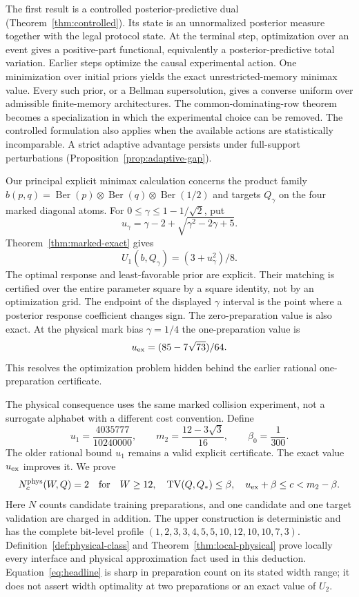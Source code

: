 \documentclass[11pt]{amsart}
\theoremstyle{definition}\newtheorem{definition}[theorem]{Definition}
\theoremstyle{remark}\newtheorem{remark}[theorem]{Remark}
\newcommand{\TV}{\operatorname{TV}}
\newcommand{\Ber}{\operatorname{Ber}}
\newcommand{\1}{\mathbf 1}
\begin{document}
The first result is a controlled posterior-predictive dual
(Theorem~\ref{thm:controlled}). Its state is an unnormalized posterior
measure together with the legal protocol state. At the terminal step,
optimization over an event gives a positive-part functional, equivalently
a posterior-predictive total variation. Earlier steps optimize the
causal experimental action. One minimization over initial priors yields
the exact unrestricted-memory minimax value. Every such prior, or a
Bellman supersolution, gives a converse uniform over admissible
finite-memory architectures. The common-dominating-row theorem becomes
a specialization in which the experimental choice can be removed.
The controlled formulation also applies when the available actions are
statistically incomparable. A strict adaptive advantage persists under
full-support perturbations (Proposition~\ref{prop:adaptive-gap}).

Our principal explicit minimax calculation concerns the product family
$b(p,q)=\Ber(p)\otimes\Ber(q)\otimes\Ber(1/2)$ and targets
$Q_\gamma$ on the four marked diagonal atoms. For
$0\le\gamma\le1-1/\sqrt2$, put
\[
 u_\gamma=\gamma-2+\sqrt{\gamma^2-2\gamma+5}.
\]
Theorem~\ref{thm:marked-exact} gives
\[
                 U_1(b,Q_\gamma)=(3+u_\gamma^2)/8.
\]
The optimal response and least-favorable prior are explicit. Their
matching is certified over the entire parameter square by a square
identity, not by an optimization grid. The endpoint of the displayed
$\gamma$ interval is the point where a posterior response coefficient
changes sign. The zero-preparation value is also exact. At the physical
mark bias $\gamma=1/4$ the one-preparation value is
\[
                   u_{\rm ex}=(85-7\sqrt{73})/64.
\]
This resolves the optimization problem hidden behind the earlier
rational one-preparation certificate.

The physical consequence uses the same marked collision experiment,
not a surrogate alphabet with a different cost convention. Define
\begin{equation}\label{eq:constants}
 u_1=\frac{4035777}{10240000},\qquad
 m_2=\frac{12-3\sqrt3}{16},\qquad \beta_0=\frac1{300}.
\end{equation}
The older rational bound $u_1$ remains a valid explicit certificate.
The exact value $u_{\rm ex}$ improves it. We prove
\begin{equation}\label{eq:headline}
 N_c^{\rm phys}(W,Q)=2\quad\text{for}\quad
 W\ge12,\quad\TV(Q,Q_*)\le\beta,\quad
 u_{\rm ex}+\beta\le c<m_2-\beta.
\end{equation}
Here $N$ counts candidate training preparations, and one candidate and
one target validation are charged in addition. The upper construction
is deterministic and has the complete bit-level profile
$(1,2,3,3,4,5,5,10,12,10,10,7,3)$.
Definition~\ref{def:physical-class} and Theorem~\ref{thm:local-physical}
prove locally every interface and physical approximation fact used in
this deduction. Equation~\eqref{eq:headline} is sharp in preparation
count on its stated width range; it does not assert width optimality
at two preparations or an exact value of $U_2$.
\end{document}
